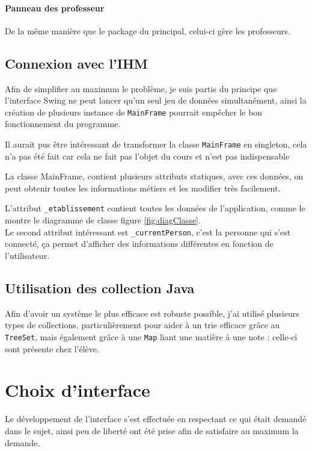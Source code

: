 \documentclass[a4paper, 11pt]{article}
\begin{document}
		\paragraph{Panneau des professeur}
		De la même manière que le package du principal, celui-ci gère les professeurs.

		\subsection{Connexion avec l'IHM}
		Afin de simplifier au maximum le problème, je suis partis du principe que l'interface Swing ne peut lancer qu'un seul jeu de données simultanément, ainsi
		la création de plusieurs instance de \texttt{MainFrame} pourrait empêcher le bon fonctionnement du programme.

		\begin{remarque}
			Il aurait pus être intéressant de transformer la classe \texttt{MainFrame} en singleton, cela n'a pas été fait car cela ne fait pas l'objet du cours
			et n'est pas indispensable
		\end{remarque}

		La classe MainFrame, contient plusieurs attributs statiques, avec ces données, on peut obtenir toutes les informations métiers et les modifier très
		facilement.

		L'attribut \texttt{\_etablissement} contient toutes les données de l'application, comme le montre le diagramme de classe figure \ref{fig:diagClasse}. \\
		Le second attribut intéressant est \texttt{\_currentPerson}, c'est la personne qui s'est connecté, ça permet d'afficher des informations différentes en
		fonction de l'utilisateur.

		\subsection{Utilisation des collection Java}
		Afin d'avoir un système le plus efficace est robuste possible, j'ai utilisé plusieurs types de collections, particulièrement pour aider à un trie
		efficace grâce au \texttt{TreeSet}, mais également grâce à une \texttt{Map} liant une matière à une note : celle-ci sont présente chez l'élève.

	\section{Choix d'interface}
	Le développement de l'interface s'est effectuée en respectant ce qui était demandé dans le sujet, ainsi peu de liberté ont été prise afin de satisfaire au
	maximum la demande.
\end{document}

